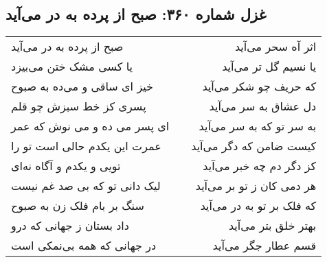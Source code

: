 \begin{center}
\section*{غزل شماره ۳۶۰: صبح از پرده به در می‌آید}
\label{sec:360}
\begin{longtable}{l p{0.5cm} r}
صبح از پرده به در می‌آید
&&
اثر آه سحر می‌آید
\\
یا کسی مشک ختن می‌بیزد
&&
یا نسیم گل تر می‌آید
\\
خیز ای ساقی و می‌ده به صبوح
&&
که حریف چو شکر می‌آید
\\
پسری کز خط سبزش چو قلم
&&
دل عشاق به سر می‌آید
\\
ای پسر می ده و می نوش که عمر
&&
به سر تو که به سر می‌آید
\\
عمرت این یکدم حالی است تو را
&&
کیست ضامن که دگر می‌آید
\\
تویی و یکدم و آگاه نه‌ای
&&
کز دگر دم چه خبر می‌آید
\\
لیک دانی تو که بی صد غم نیست
&&
هر دمی کان ز تو بر می‌آید
\\
سنگ بر بام فلک زن به صبوح
&&
که فلک بر تو به در می‌آید
\\
داد بستان ز جهانی که درو
&&
بهتر خلق بتر می‌آید
\\
در جهانی که همه بی‌نمکی است
&&
قسم عطار جگر می‌آید
\\
\end{longtable}
\end{center}
